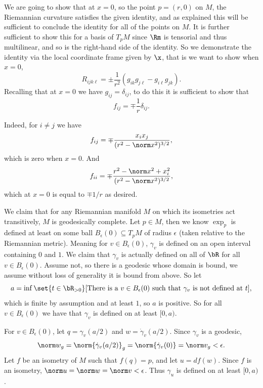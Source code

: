     We are going to show that at $x=0$, so the point $p=(r,0)$ on $M$, the Riemannian curvature satisfies the given identity, and as explained this will be sufficient to conclude the identity for all of the points on $M$.
    It is further sufficient to show this for a basis of $T_pM$ since $\Rm$ is tensorial and thus multilinear, and so is the right-hand side of the identity.
    So we demonstrate the identity via the local coordinate frame given by $\x$, that is we want to show when $x=0$,
    $$ R_{ijk\ell} = \pm\frac1{r^2}(g_{ik}g_{j\ell} - g_{i\ell}g_{jk}) . $$
    Recalling that at $x=0$ we have $g_{ij}=\delta_{ij}$, to do this it is sufficient to show that
    $$ f_{ij} = \mp\frac1r\delta_{ij} . $$

    Indeed, for $i\neq j$ we have
    $$ f_{ij} = \mp\frac{x_ix_j}{(r^2-\norm x^2)^{3/2}} , $$
    which is zero when $x=0$.
    And
    $$ f_{ii} = \mp\frac{r^2-\norm x^2+x_i^2}{(r^2-\norm x^2)^{3/2}} , $$
    which at $x=0$ is equal to $\mp 1/r$ as desired.

    \item We claim that for any Riemannian manifold $M$ on which its isometries act transitively, $M$ is geodesically complete.
    Let $p\in M$, then we know $\exp_p$ is defined at least on some ball $B_\epsilon(0)\subseteq T_pM$ of radius $\epsilon$ (taken relative to the Riemannian metric).
    Meaning for $v\in B_\epsilon(0)$, $\gamma_v$ is defined on an open interval containing $0$ and $1$.
    We claim that $\gamma_v$ is actually defined on all of $\bR$ for all $v\in B_\epsilon(0)$.
    Assume not, so there is a geodesic whose domain is bound, we assume without loss of generality it is bound from above.
    So let
    $$ a = \inf\set{t\in\bR_{>0}}[\hbox{There is a $v\in B_\epsilon(0)$ such that $\gamma_v$ is not defined at $t$}] , $$
    which is finite by assumption and at least $1$, so $a$ is positive.
    So for all $v\in B_\epsilon(0)$ we have that $\gamma_v$ is defined on at least $[0,a)$.

    For $v\in B_\epsilon(0)$, let $q=\gamma_v(a/2)$ and $w=\dot\gamma_v(a/2)$.
    Since $\gamma_v$ is a geodesic,
    $$ \norm w_g = \norm{\dot\gamma_v(a/2)}_g = \norm{\dot\gamma_v(0)} = \norm v_g < \epsilon . $$
    Let $f$ be an isometry of $M$ such that $f(q)=p$, and let $u=df(w)$.
    Since $f$ is an isometry, $\norm u=\norm w=\norm v<\epsilon$.
    Thus $\gamma_u$ is defined on at least $[0,a)$.

